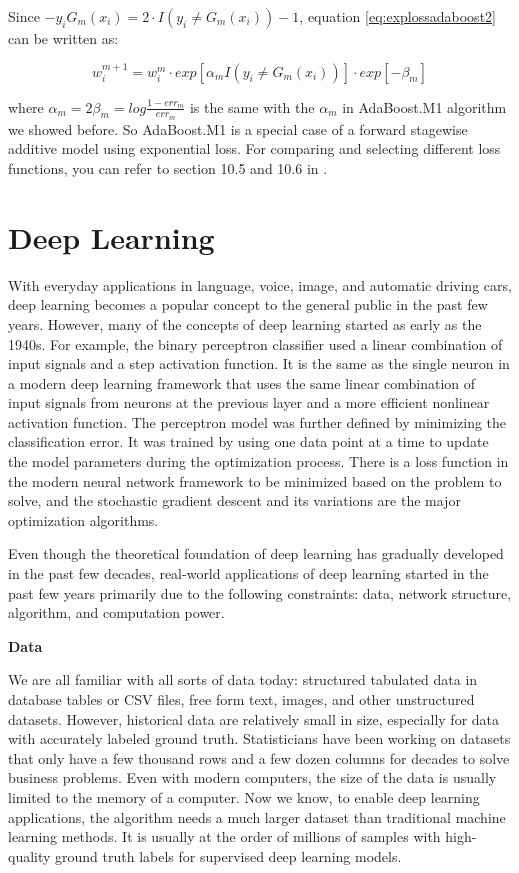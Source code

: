 \documentclass[12pt,]{krantz}
\begin{document}
Since \(-y_i G_m(x_i)=2\cdot I(y_i \neq G_m(x_i))-1\), equation \eqref{eq:explossadaboost2} can be written as:

\[w_i^{m+1}=w_i^m \cdot exp[\alpha_mI(y_i\neq G_m(x_i))] \cdot exp[-\beta_m]\]

where \(\alpha_m=2\beta_m=log\frac{1-err_m}{err_m}\) is the same with the \(\alpha_m\) in AdaBoost.M1 algorithm we showed before. So AdaBoost.M1 is a special case of a forward stagewise additive model using exponential loss. For comparing and selecting different loss functions, you can refer to section 10.5 and 10.6 in \citep{Hastie2008}.

\hypertarget{deep-learning}{%
\chapter{Deep Learning}\label{deep-learning}}

With everyday applications in language, voice, image, and automatic driving cars, deep learning becomes a popular concept to the general public in the past few years. However, many of the concepts of deep learning started as early as the 1940s. For example, the binary perceptron classifier used a linear combination of input signals and a step activation function. It is the same as the single neuron in a modern deep learning framework that uses the same linear combination of input signals from neurons at the previous layer and a more efficient nonlinear activation function. The perceptron model was further defined by minimizing the classification error. It was trained by using one data point at a time to update the model parameters during the optimization process. There is a loss function in the modern neural network framework to be minimized based on the problem to solve, and the stochastic gradient descent and its variations are the major optimization algorithms.

Even though the theoretical foundation of deep learning has gradually developed in the past few decades, real-world applications of deep learning started in the past few years primarily due to the following constraints: data, network structure, algorithm, and computation power.

\textbf{Data}

We are all familiar with all sorts of data today: structured tabulated data in database tables or CSV files, free form text, images, and other unstructured datasets. However, historical data are relatively small in size, especially for data with accurately labeled ground truth. Statisticians have been working on datasets that only have a few thousand rows and a few dozen columns for decades to solve business problems. Even with modern computers, the size of the data is usually limited to the memory of a computer. Now we know, to enable deep learning applications, the algorithm needs a much larger dataset than traditional machine learning methods. It is usually at the order of millions of samples with high-quality ground truth labels for supervised deep learning models.
\end{document}
